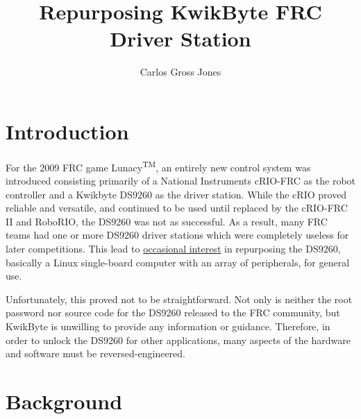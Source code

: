\documentclass[]{article}
\title{Repurposing KwikByte FRC Driver Station}
\author{Carlos Gross Jones}
\begin{document}
\maketitle

\begin{abstract}

\end{abstract}

\section{Introduction}
\par For the 2009 FRC game Lunacy\textsuperscript{TM}, an entirely new control system was introduced consisting primarily of a National Instruments cRIO-FRC as the robot controller and a Kwikbyte DS9260 as the driver station. While the cRIO proved reliable and versatile, and continued to be used until replaced by the cRIO-FRC II and RoboRIO, the DS9260 was not as successful. As a result, many FRC teams had one or more DS9260 driver stations which were completely useless for later competitions. This lead to \href{https://www.chiefdelphi.com/forums/showthread.php?t=102417}{occasional interest} in repurposing the DS9260, basically a Linux single-board computer with an array of peripherals, for general use. 
\par Unfortunately, this proved not to be straightforward. Not only is neither the root password nor source code for the DS9260 released to the FRC community, but KwikByte is unwilling to provide any information or guidance. Therefore, in order to unlock the DS9260 for other applications, many aspects of the hardware and software must be reversed-engineered. 
\section{Background}
\end{document}
